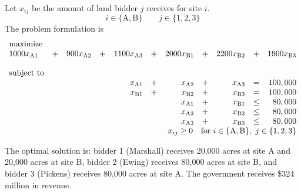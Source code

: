 \begin{enumerate}
\begin{solution}
\begin{center}
\end{center}

Let $x_{ij}$ be the amount of land bidder $j$ receives for site $i$.
  \[
     i \in \{\text{A},\text{B}\} \qquad j \in \{1,2,3\}
  \]
  The problem formulation is
\[
  \begin{array}{lrrrrrrrrrr}
    \textrm{maximize} &&&&&&&&&&\\   
    1000x_{\text{A}1}&+& 900x_{\text{A}2}&+&1100x_{\text{A}3}&+&2000x_{\text{B}1}&+&2200x_{\text{B}2}&+&1900x_{\text{B}3} \\ \\
    \textrm{subject to}  &&&&&&&&&&\\
    & & & & x_{\text{A}1}&+ & x_{\text{A}2}&+ &x_{\text{A}3} & = & 100,000 \\
    & & & & x_{\text{B}1}&+ & x_{\text{B}2}&+ &x_{\text{B}3} & = & 100,000 \\
    & & & & & &  x_{\text{A}1} & + & x_{\text{B}1} & \leq & 80,000 \\
    & & & & & &  x_{\text{A}2} & + & x_{\text{B}2} & \leq & 80,000 \\
    & & & & & &  x_{\text{A}3} & + & x_{\text{B}3} & \leq & 80,000 \\
    \multicolumn{11}{r}{x_{ij} \geq 0 \quad \text{for}~i \in \{\text{A},\text{B}\},~j \in \{1,2,3\} }
  \end{array}
\]

The optimal solution
is: bidder 1 (Marshall) receives 20,000 acres at site A and 20,000
acres at site B, bidder 2 (Ewing) receives 80,000 acres at site B, and
bidder 3 (Pickens) receives 80,000 acres at site A. The government
receives \$324 million in revenue.
\end{solution}


\end{enumerate}
